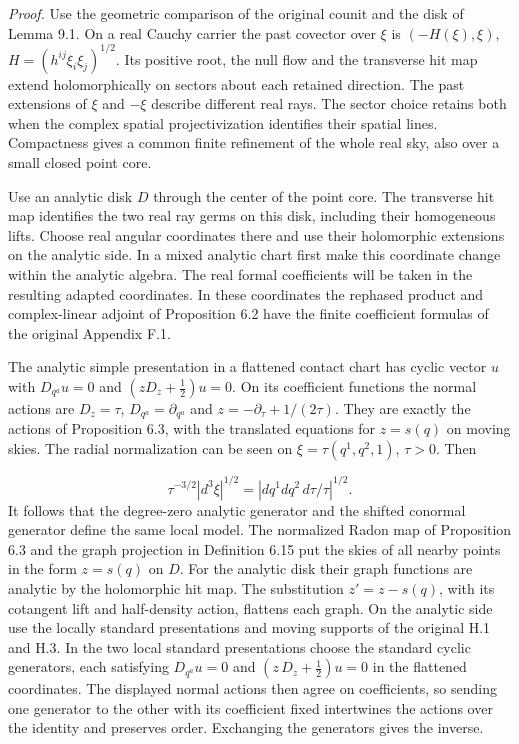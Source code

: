 \documentclass[
  english,
  11pt,
  reqno]{amsart}
\begin{document}
\emph{Proof.} Use the geometric comparison of the original counit and
the disk of Lemma 9.1. On a real Cauchy carrier the past covector over
\(\xi\) is \((-H(\xi),\xi)\), \(H=(h^{ij}\xi_i\xi_j)^{1/2}\). Its
positive root, the null flow and the transverse hit map extend
holomorphically on sectors about each retained direction. The past
extensions of \(\xi\) and \(-\xi\) describe different real rays. The
sector choice retains both when the complex spatial projectivization
identifies their spatial lines. Compactness gives a common finite
refinement of the whole real sky, also over a small closed point core.

Use an analytic disk \(D\) through the center of the point core. The
transverse hit map identifies the two real ray germs on this disk,
including their homogeneous lifts. Choose real angular coordinates there
and use their holomorphic extensions on the analytic side. In a mixed
analytic chart first make this coordinate change within the analytic
algebra. The real formal coefficients will be taken in the resulting
adapted coordinates. In these coordinates the rephased product and
complex-linear adjoint of Proposition 6.2 have the finite coefficient
formulas of the original Appendix F.1.

The analytic simple presentation in a flattened contact chart has cyclic
vector \(u\) with \(D_{q^a}u=0\) and \((zD_z+\tfrac12)u=0\). On its
coefficient functions the normal actions are \(D_z=\tau\),
\(D_{q^a}=\partial_{q^a}\) and \(z=-\partial_\tau+1/(2\tau)\). They are
exactly the actions of Proposition 6.3, with the translated equations
for \(z=s(q)\) on moving skies. The radial normalization can be seen on
\(\xi=\tau(q^1,q^2,1)\), \(\tau>0\). Then

\label{eq:analytic-sector-half-form} \[
\tau^{-3/2}|d^3\xi|^{1/2}
   =|dq^1dq^2\,d\tau/\tau|^{1/2}.
\] It follows that the degree-zero analytic generator and the shifted
conormal generator define the same local model. The normalized Radon map
of Proposition 6.3 and the graph projection in Definition 6.15 put the
skies of all nearby points in the form \(z=s(q)\) on \(D\). For the
analytic disk their graph functions are analytic by the holomorphic hit
map. The substitution \(z'=z-s(q)\), with its cotangent lift and
half-density action, flattens each graph. On the analytic side use the
locally standard presentations and moving supports of the original H.1
and H.3. In the two local standard presentations choose the standard
cyclic generators, each satisfying \(D_{q^a}u=0\) and
\((z\,D_z+\tfrac12)u=0\) in the flattened coordinates. The displayed
normal actions then agree on coefficients, so sending one generator to
the other with its coefficient fixed intertwines the actions over the
identity and preserves order. Exchanging the generators gives the
inverse.
\end{document}
